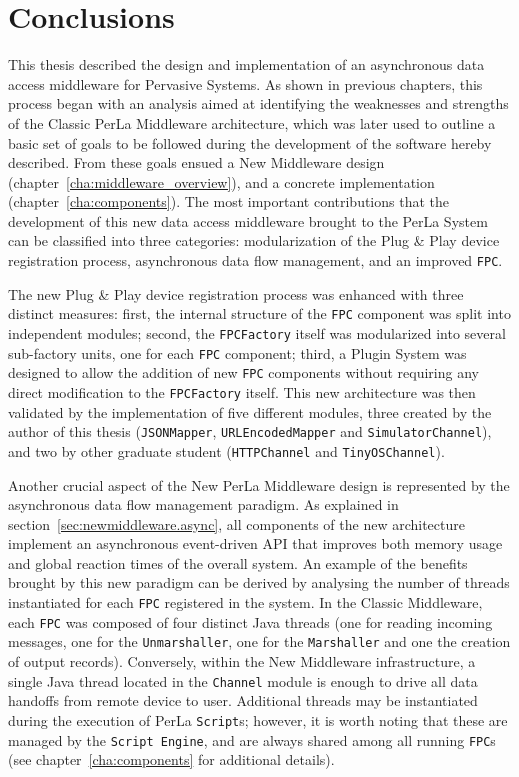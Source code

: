 \chapter{Conclusions}
\label{cha:conclusions}

This thesis described the design and implementation of an asynchronous data
access middleware for Pervasive Systems. As shown in previous chapters, this
process began with an analysis aimed at identifying the weaknesses and
strengths of the Classic PerLa Middleware architecture, which was later used to
outline a basic set of goals to be followed during the development of the
software hereby described. From these goals ensued a New Middleware design
(chapter~\ref{cha:middleware_overview}), and a concrete implementation
(chapter~\ref{cha:components}). The most important contributions that the
development of this new data access middleware brought to the PerLa System can
be classified into three categories: modularization of the Plug \& Play device
registration process, asynchronous data flow management, and an improved
\texttt{FPC}. 

The new Plug \& Play device registration process was enhanced with three
distinct measures: first, the internal structure of the \texttt{FPC} component
was split into independent modules; second, the \texttt{FPCFactory} itself was
modularized into several sub-factory units, one for each \texttt{FPC}
component; third, a Plugin System was designed to allow the addition of new
\texttt{FPC} components without requiring any direct modification to the
\texttt{FPCFactory} itself. This new architecture was then validated by the
implementation of five different modules, three created by the author of this
thesis (\texttt{JSONMapper}, \texttt{URLEncodedMapper} and
\texttt{SimulatorChannel}), and two by other graduate student
(\texttt{HTTPChannel} and \texttt{TinyOSChannel}).

Another crucial aspect of the New PerLa Middleware design is represented by the
asynchronous data flow management paradigm. As explained in
section~\ref{sec:newmiddleware.async}, all components of the new architecture
implement an asynchronous event-driven API that improves both memory usage and
global reaction times of the overall system. An example of the benefits brought
by this new paradigm can be derived by analysing the number of threads
instantiated for each \texttt{FPC} registered in the system. In the Classic
Middleware, each \texttt{FPC} was composed of four distinct Java threads (one
for reading incoming messages, one for the \texttt{Unmarshaller}, one for the
    \texttt{Marshaller} and one the creation of output records). Conversely,
    within the New Middleware infrastructure, a single Java thread located in
    the \texttt{Channel} module is enough to drive all data handoffs from
    remote device to user. Additional threads may be instantiated during the
    execution of PerLa \texttt{Script}s; however, it is worth noting that these
    are managed by the \texttt{Script Engine}, and are always shared among all
    running \texttt{FPC}s (see chapter~\ref{cha:components} for additional
    details).

